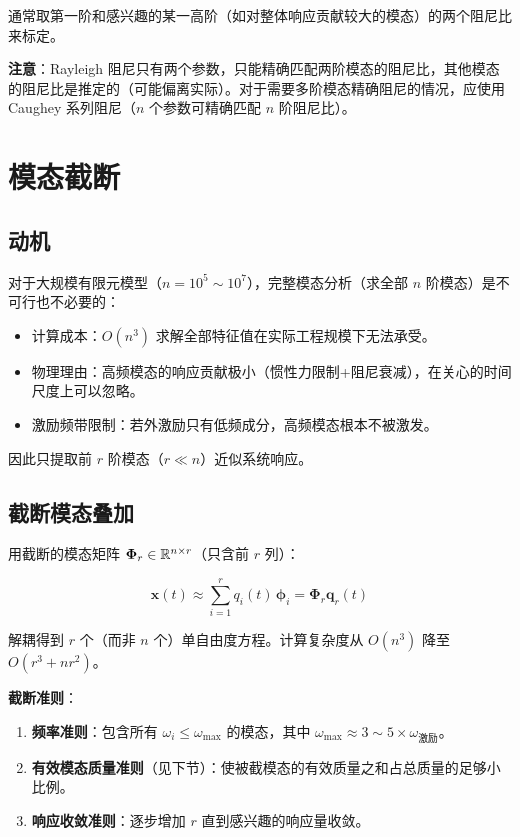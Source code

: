 通常取第一阶和感兴趣的某一高阶（如对整体响应贡献较大的模态）的两个阻尼比来标定。

\textbf{注意}：Rayleigh 阻尼只有两个参数，只能精确匹配两阶模态的阻尼比，其他模态的阻尼比是推定的（可能偏离实际）。对于需要多阶模态精确阻尼的情况，应使用 Caughey 系列阻尼（$n$ 个参数可精确匹配 $n$ 阶阻尼比）。

\section{模态截断}

\subsection{动机}

对于大规模有限元模型（$n = 10^5 \sim 10^7$），完整模态分析（求全部 $n$ 阶模态）是不可行也不必要的：

\begin{itemize}
\item 计算成本：$O(n^3)$ 求解全部特征值在实际工程规模下无法承受。
\item 物理理由：高频模态的响应贡献极小（惯性力限制+阻尼衰减），在关心的时间尺度上可以忽略。
\item 激励频带限制：若外激励只有低频成分，高频模态根本不被激发。
\end{itemize}

因此只提取前 $r$ 阶模态（$r \ll n$）近似系统响应。

\subsection{截断模态叠加}

用截断的模态矩阵 $\mathbf{\Phi}_r \in \mathbb{R}^{n\times r}$（只含前 $r$ 列）：

\[
\mathbf{x}(t) \approx \sum_{i=1}^{r} q_i(t)\,\bm{\phi}_i = \mathbf{\Phi}_r \mathbf{q}_r(t)
\]

解耦得到 $r$ 个（而非 $n$ 个）单自由度方程。计算复杂度从 $O(n^3)$ 降至 $O(r^3 + nr^2)$。

\textbf{截断准则}：

\begin{enumerate}
\item \textbf{频率准则}：包含所有 $\omega_i \leq \omega_{\max}$ 的模态，其中 $\omega_{\max} \approx 3\sim5 \times \omega_{\text{激励}}$。

\item \textbf{有效模态质量准则}（见下节）：使被截模态的有效质量之和占总质量的足够小比例。

\item \textbf{响应收敛准则}：逐步增加 $r$ 直到感兴趣的响应量收敛。
\end{enumerate}

